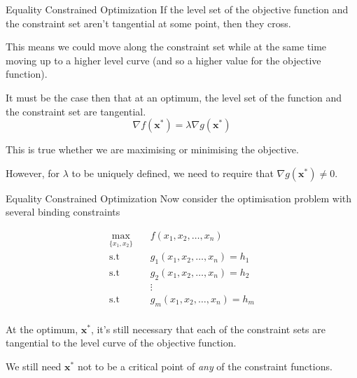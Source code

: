 \documentclass[11pt, xcolor={dvipsnames}, hyperref={colorlinks, allcolors=Blue}]{beamer}
\newcommand{\x}{\mathbf{x}}
\begin{document}
\begin{frame}{Equality Constrained Optimization}
If the level set of the objective function and the constraint set aren't tangential at some point, then they cross. \bigskip

This means we could move along the constraint set while at the same time moving up to a higher level curve (and so a higher value for the objective function). \bigskip

It must be the case then that at an optimum, the level set of the function and the constraint set are tangential. \\


\[\nabla f(\x^{*}) = \lambda \nabla g(\x^{*})\]
\smallskip

This is true whether we are maximising or minimising the objective.
\vfill\vfill

However, for $\lambda$ to be uniquely defined, we need to require that $\nabla g(\x^{*}) \not = 0$.

\end{frame}

\begin{frame}{Equality Constrained Optimization}
Now consider the optimisation problem with several binding constraints

\begin{align*}
\underset{\{x_{1}, x_{2}\}}{\mathrm{max}}  \quad& f(x_{1}, x_{2},\dots, x_{n})\\
\text{s.t}\quad \ \ & g_{1}(x_{1}, x_{2},\dots,x_{n}) = h_{1}\\
\text{s.t}\quad \ \ & g_{2}(x_{1}, x_{2},\dots,x_{n}) = h_{2}\\
& \vdots\\
\text{s.t}\quad \ \ & g_{m}(x_{1}, x_{2},\dots,x_{n}) = h_{m}\\
\end{align*}


At the optimum, $\x^{*}$, it's still necessary that each of the constraint sets are tangential to the level curve of the objective function. \bigskip

We still need $\x^{*}$ not to be a critical point of \emph{any} of the constraint functions.


\end{frame}
\end{document}
